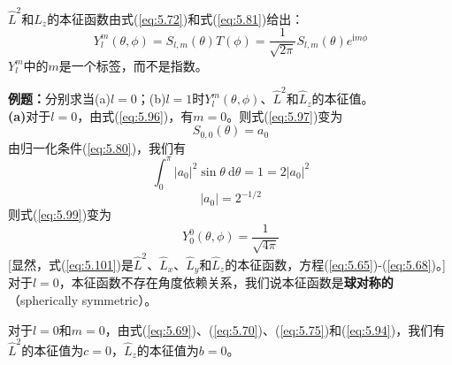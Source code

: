     $\hat{L}^2$和$\hat{L}_z$的本征函数由式(\ref{eq:5.72})和式(\ref{eq:5.81})给出：
    \begin{equation}
        \boxed{
            Y^m_l\left(\theta,\phi\right) = S_{l,m}\left(\theta\right)T\left(\phi\right) = \frac{1}{\sqrt{2\pi}}S_{l,m}\left(\theta\right)e^{\mathrm{i}m\phi}
        }
        \label{eq:5.99}
    \end{equation}
    $Y^m_l$中的$m$是一个标签，而不是指数。
    \begin{examplebox}
        \textbf{例题：}分别求当(a)$l=0$；(b)$l=1$时$Y_l^m\left(\theta,\phi\right)$、$\hat{L}^2$和$\hat{L}_z$的本征值。
        \\

        \textbf{(a)}对于$l=0$，由式(\ref{eq:5.96})，有$m=0$。则式(\ref{eq:5.97})变为
        \begin{equation}
            S_{0,0}\left(\theta\right) = a_0
            \label{eq:5.100}
        \end{equation}
        由归一化条件(\ref{eq:5.80})，我们有
        \begin{equation*}
            \int_{0}^{\pi}\left|a_0\right|^2 \sin\theta \: \mathrm{d}\theta = 1 = 2\left|a_0\right|^2
        \end{equation*}
        \begin{equation*}
            \left|a_0\right| = 2^{-1/2}
        \end{equation*}
        则式(\ref{eq:5.99})变为
        \begin{equation}
            Y^0_0\left(\theta,\phi\right) = \frac{1}{\sqrt{4\pi}}
            \label{eq:5.101}
        \end{equation}
        [显然，式(\ref{eq:5.101})是$\hat{L}^2$、$\hat{L}_x$、$\hat{L}_y$和$\hat{L}_z$的本征函数，方程(\ref{eq:5.65})-(\ref{eq:5.68})。]对于$l=0$，本征函数不存在角度依赖关系，我们说本征函数是\textbf{球对称的}（spherically symmetric）。

        对于$l=0$和$m=0$，由式(\ref{eq:5.69})、(\ref{eq:5.70})、(\ref{eq:5.75})和(\ref{eq:5.94})，我们有$\hat{L}^2$的本征值为$c=0$，$\hat{L}_z$的本征值为$b=0$。


\end{examplebox}
